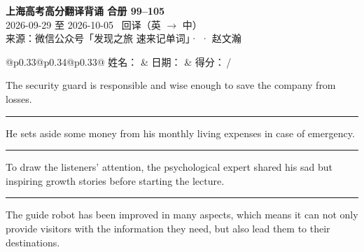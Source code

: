 \documentclass[11pt,a4paper]{article}
\newcommand{\num}[1]{\makebox[1.9em][r]{#1.}\hspace{0.3em}}
\newcommand{\wline}{\noindent\rule{\linewidth}{0.4pt}}
\begin{document}
\pagestyle{plain}
\begin{center}
{\LARGE\bfseries 上海高考高分翻译背诵 \quad 合册 99–105}\\[0.25em]
{\large 2026-09-29 至 2026-10-05 \quad\ 回译（英 $\to$ 中）}\\[0.35em]
{\footnotesize 来源：微信公众号「发现之旅 速来记单词」·  · 赵文瀚}
\end{center}

\vspace{0.4em}
\noindent\begin{tabular}{@{}p{0.33\textwidth}@{}p{0.34\textwidth}@{}p{0.33\textwidth}@{}}
姓名：\underline{\hspace{2.0cm}} & 日期：\underline{\hspace{2.0cm}} & 得分：\underline{\hspace{1.4cm}}\,/ \\
\end{tabular}

\vspace{0.5em}

\vspace{0.8em}
\vspace{0.35em}\vspace{0.15em}

\num{1}The security guard is responsible and wise enough to save the company from losses.

\vspace{0.25em}

\wline

\num{2}He sets  aside some money from his monthly living expenses in case of emergency.

\vspace{0.25em}

\wline

\num{3}To draw the listeners’ attention, the psychological expert shared his sad but inspiring growth stories before starting the lecture.

\vspace{0.25em}

\wline

\num{4}The guide robot has been improved in many aspects, which means it can not only provide visitors with the information they need, but also lead them to their destinations.

\vspace{0.25em}
\end{document}
